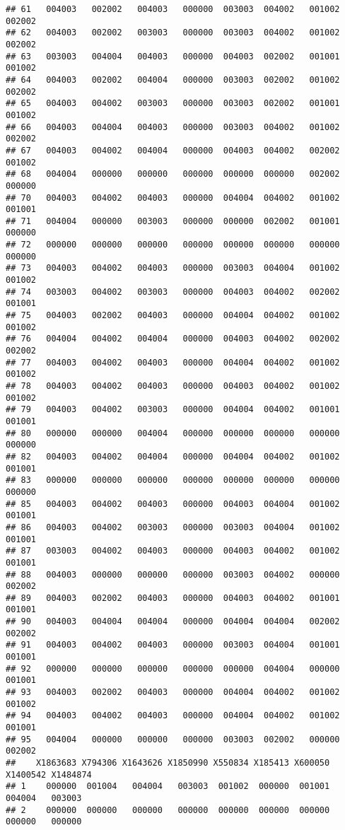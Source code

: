 \documentclass[
]{article}
\begin{document}
\begin{verbatim}
## 61   004003   002002   004003   000000  003003  004002   001002   002002
## 62   004003   002002   003003   000000  003003  004002   001002   002002
## 63   003003   004004   004003   000000  004003  002002   001001   001002
## 64   004003   002002   004004   000000  003003  002002   001002   002002
## 65   004003   004002   003003   000000  003003  002002   001001   001002
## 66   004003   004004   004003   000000  003003  004002   001002   002002
## 67   004003   004002   004004   000000  004003  004002   002002   001002
## 68   004004   000000   000000   000000  000000  000000   002002   000000
## 70   004003   004002   004003   000000  004004  004002   001002   001001
## 71   004004   000000   003003   000000  000000  002002   001001   000000
## 72   000000   000000   000000   000000  000000  000000   000000   000000
## 73   004003   004002   004003   000000  003003  004004   001002   001002
## 74   003003   004002   003003   000000  004003  004002   002002   001001
## 75   004003   002002   004003   000000  004004  004002   001002   001002
## 76   004004   004002   004004   000000  004003  004002   002002   002002
## 77   004003   004002   004003   000000  004004  004002   001002   001002
## 78   004003   004002   004003   000000  004003  004002   001002   001002
## 79   004003   004002   003003   000000  004004  004002   001001   001001
## 80   000000   000000   004004   000000  000000  000000   000000   000000
## 82   004003   004002   004004   000000  004004  004002   001002   001001
## 83   000000   000000   000000   000000  000000  000000   000000   000000
## 85   004003   004002   004003   000000  004003  004004   001002   001001
## 86   004003   004002   003003   000000  003003  004004   001002   001001
## 87   003003   004002   004003   000000  004003  004002   001002   001001
## 88   004003   000000   000000   000000  003003  004002   000000   002002
## 89   004003   002002   004003   000000  004003  004002   001001   001001
## 90   004003   004004   004004   000000  004004  004004   002002   002002
## 91   004003   004002   004003   000000  003003  004004   001001   001001
## 92   000000   000000   000000   000000  000000  004004   000000   001001
## 93   004003   002002   004003   000000  004004  004002   001002   001002
## 94   004003   004002   004003   000000  004004  004002   001002   001001
## 95   004004   000000   000000   000000  003003  002002   000000   002002
##    X1863683 X794306 X1643626 X1850990 X550834 X185413 X600050 X1400542 X1484874
## 1    000000  001004   004004   003003  001002  000000  001001   004004   003003
## 2    000000  000000   000000   000000  000000  000000  000000   000000   000000

\end{verbatim}
\end{document}
